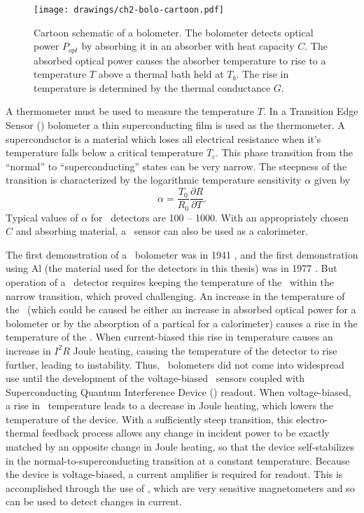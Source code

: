 \begin{figure*}
\centering
\texttt{[image: drawings/ch2-bolo-cartoon.pdf]}
\caption[Bolometer Schematic]{
  Cartoon schematic of a bolometer.
  The bolometer detects optical power $P_{opt}$ by absorbing it in an absorber with heat capacity $C$.
  The absorbed optical power causes the absorber temperature to rise to a temperature $T$ above a thermal bath held at $T_b$.
  The rise in temperature is determined by the thermal conductance $G$.
}
\label{fig:ch2-bolo-cartoon}
\end{figure*}

A thermometer must be used to measure the temperature $T$.
In a Transition Edge Sensor (\TES) bolometer a thin superconducting film is used as the thermometer.
A superconductor is a material which loses all electrical resistance when it's temperature falls below a critical temperature $T_c$.
This phase transition from the ``normal'' to ``superconducting'' states can be very narrow.
The steepness of the transition is characterized by the logarithmic temperature sensitivity $\alpha$ given by
\begin{equation}
  \alpha = \frac{T_0}{R_0} \frac{\partial R}{\partial T}.
\end{equation}
Typical values of $\alpha$ for \TES\ detectors are 100 -- 1000.
With an appropriately chosen $C$ and absorbing material, a \TES\ sensor can also be used as a calorimeter.

The first demonstration of a \TES\ bolometer was in 1941 \cite{andrews_attenuated_1942}, and the first demonstration using Al (the material used for the detectors in this thesis) was in 1977 \cite{clarke_superconductive_1977}.
But operation of a \TES\ detector requires keeping the temperature of the \TES\ within the narrow transition, which proved challenging.
An increase in the temperature of the \TES\ (which could be caused be either an increase in absorbed optical power for a bolometer or by the absorption of a partical for a calorimeter) causes a rise in the temperature of the \TES.
When current-biased this rise in temperature causes an increase in $I^2 R$ Joule heating, causing the temperature of the detector to rise further, leading to instability.
Thus, \TES\ bolometers did not come into widespread use until the development of the voltage-biased \TES\ sensors \cite{irwin_application_1995} coupled with Superconducting Quantum Interference Device (\SQUID) readout.
When voltage-biased, a rise in \TES\ temperature leads to a decrease in Joule heating, which lowers the temperature of the device.
With a sufficiently steep transition, this electro-thermal feedback process allows any change in incident power to be exactly matched by an opposite change in Joule heating, so that the device self-stabilizes in the normal-to-superconducting transition at a constant temperature.
Because the device is voltage-biased, a current amplifier is required for readout.
This is accomplished through the use of \SQUIDs, which are very sensitive magnetometers and so can be used to detect changes in current.

